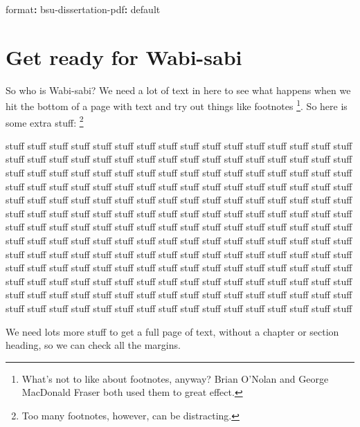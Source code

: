 \documentclass[
  dissertation]{bsu-cs}
\newenvironment{Shaded}{\begin{snugshade}}{\end{snugshade}}
\newcommand{\AttributeTok}[1]{\textcolor[rgb]{0.40,0.45,0.13}{#1}}
\newcommand{\FunctionTok}[1]{\textcolor[rgb]{0.28,0.35,0.67}{#1}}
\newcommand{\KeywordTok}[1]{\textcolor[rgb]{0.00,0.23,0.31}{\textbf{#1}}}
\begin{document}
\begin{Shaded}
\begin{Highlighting}[]
\FunctionTok{format}\KeywordTok{:}
\AttributeTok{  }\FunctionTok{bsu{-}dissertation{-}pdf}\KeywordTok{:}\AttributeTok{ default}
\end{Highlighting}
\end{Shaded}

\section{Get ready for Wabi-sabi}\label{sec-getReady}

So who is Wabi-sabi? We need a lot of text in here to see what happens
when we hit the bottom of a page with text and try out things like
footnotes \footnote{What's not to like about footnotes, anyway? Brian
  O'Nolan and George MacDonald Fraser both used them to great effect.}.
So here is some extra stuff: \footnote{Too many footnotes, however, can
  be distracting.}

stuff stuff stuff stuff stuff stuff stuff stuff stuff stuff stuff stuff
stuff stuff stuff stuff stuff stuff stuff stuff stuff stuff stuff stuff
stuff stuff stuff stuff stuff stuff stuff stuff stuff stuff stuff stuff
stuff stuff stuff stuff stuff stuff stuff stuff stuff stuff stuff stuff
stuff stuff stuff stuff stuff stuff stuff stuff stuff stuff stuff stuff
stuff stuff stuff stuff stuff stuff stuff stuff stuff stuff stuff stuff
stuff stuff stuff stuff stuff stuff stuff stuff stuff stuff stuff stuff
stuff stuff stuff stuff stuff stuff stuff stuff stuff stuff stuff stuff
stuff stuff stuff stuff stuff stuff stuff stuff stuff stuff stuff stuff
stuff stuff stuff stuff stuff stuff stuff stuff stuff stuff stuff stuff
stuff stuff stuff stuff stuff stuff stuff stuff stuff stuff stuff stuff
stuff stuff stuff stuff stuff stuff stuff stuff stuff stuff stuff stuff
stuff stuff stuff stuff stuff stuff stuff stuff stuff stuff stuff stuff
stuff stuff stuff stuff stuff stuff stuff stuff stuff stuff stuff stuff
stuff stuff stuff stuff stuff stuff stuff stuff stuff stuff stuff stuff
stuff stuff stuff stuff stuff stuff stuff stuff stuff stuff stuff stuff
stuff stuff stuff stuff stuff stuff stuff stuff stuff stuff stuff stuff
stuff stuff stuff stuff

We need lots more stuff to get a full page of text, without a chapter or
section heading, so we can check all the margins.
\end{document}
